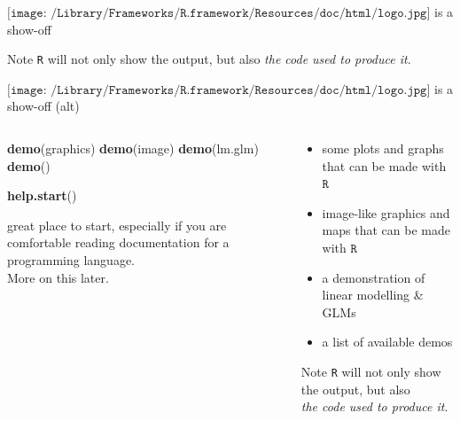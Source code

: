 \documentclass[
  ignorenonframetext,
]{beamer}
\newenvironment{Shaded}{\begin{snugshade}}{\end{snugshade}}
\newcommand{\FunctionTok}[1]{\textcolor[rgb]{0.13,0.29,0.53}{\textbf{#1}}}
\newcommand{\NormalTok}[1]{#1}
\begin{document}
\begin{frame}[fragile]{\(\texttt{[image: /Library/Frameworks/R.framework/Resources/doc/html/logo.jpg]}\)
is a show-off}
\begin{block}{Note}
\protect\hypertarget{note}{}
\texttt{R}{} will not only show the output, but also \emph{the code used
to produce it}.
\end{block}
\end{frame}

\begin{frame}[fragile]{\(\texttt{[image: /Library/Frameworks/R.framework/Resources/doc/html/logo.jpg]}\)
is a show-off (alt)}
\protect\hypertarget{includegraphicsheight1emlibraryframeworksr.frameworkresourcesdochtmllogo.jpg-is-a-show-off-alt}{}
\begin{columns}[T]
\begin{column}{0.4\textwidth}
\begin{Shaded}
\begin{Highlighting}[]
\FunctionTok{demo}\NormalTok{(graphics)  }
\FunctionTok{demo}\NormalTok{(image)     }
\FunctionTok{demo}\NormalTok{(lm.glm)    }
\FunctionTok{demo}\NormalTok{()          }

\FunctionTok{help.start}\NormalTok{()    }
\end{Highlighting}
\end{Shaded}

\hfill\break
{} great place to start, especially if you are
comfortable reading documentation for a programming language.\\
More on this later.
\end{column}

\begin{column}{0.6\textwidth}
\begin{itemize}

\item[\tikzmarknode{b1}{$\bullet$}]
  some plots and graphs that can be made with $\texttt{R}$

\item[\tikzmarknode{b2}{$\bullet$}]
  image-like graphics and maps that can be made with $\texttt{R}$

\item[\tikzmarknode{b3}{$\bullet$}]
  a demonstration of linear modelling \& GLMs

\item[\tikzmarknode{b4}{$\bullet$}]
  a list of available demos

\end{itemize}

\hfill\break

\begin{block}{Note}
\protect\hypertarget{note-1}{}
\texttt{R}{} will not only show the output, but also\\
\emph{the code used to produce it}.
\end{block}
\end{column}
\end{columns}


\end{frame}
\end{document}
